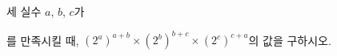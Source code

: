 세 실수 $a$, $b$, $c$가 \par\smallskip{}\par\smallskip\noindent 를 만족시킬 때, $(2^a)^{a+b}\times(2^b)^{b+c}\times(2^c)^{c+a}$의 값을 구하시오.
